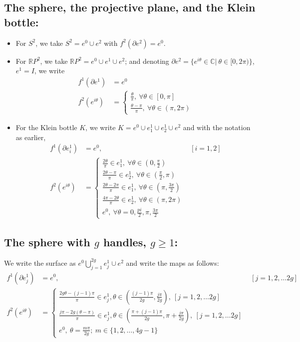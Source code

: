 \documentclass[11pt]{article}
\numberwithin{equation}{section}
\begin{document}
\subsection{\normalsize{The sphere, the projective plane, and the Klein bottle:}} 
\begin{itemize}
     \item For $S^2$, we take $S^2=e^0\cup e^2$ with $f^2(\partial e^2)=e^0$.
     \item For $\mathbb{R}P^2$, we take $\mathbb{R}P^2=e^0\cup e^1\cup e^2$; and denoting $\partial e^2=\{e^{i\theta}\in\mathbb{C}|\ \theta\in[0,2\pi)\}$, $e^1=I$, we write
     \begin{align*}
         f^1(\partial e^1) &= e^0 \\ 
         f^2(e^{i\theta})&= \begin{cases}\frac{\theta}{\pi},\ \forall\theta\in[0,\pi]\\ \frac{\theta-\pi}{\pi},\ \forall\theta\in(\pi,2\pi) \end{cases}
     \end{align*}
     \item For the Klein bottle $K$, we write $K=e^0\cup e^1_1\cup e^1_2\cup e^2$ and with the notation as earlier, 
     \begin{align*}
         f^1(\partial e^1_i) &= e^0, & [i=1,2]\\ 
         f^2(e^{i\theta})&= \begin{cases}\frac{2\theta}{\pi}\in e^1_1,\ \forall\theta\in\left(0,\frac{\pi}{2}\right) \\ \frac{2\theta-\pi}{\pi}\in e^1_2,\ \forall\theta\in\left(\frac{\pi}{2},\pi\right)\\ \frac{2\theta-2\pi}{\pi}\in e^1_1,\ \forall\theta\in\left(\pi,\frac{3\pi}{2}\right)\\ \frac{4\pi-2\theta}{\pi}\in e^1_2,\ \forall\theta\in\left(\pi,2\pi\right) \\ e^0,\ \forall \theta =0,\frac{pi}{2},\pi,\frac{3\pi}{2} \end{cases}
     \end{align*}
\end{itemize} 
\subsection{\normalsize{The sphere with $g$ handles, $g\geqslant 1$:}}
We write the surface as $e^0\bigcup_{j=1}^{2g}{e^1_j}\cup e^2$ and write the maps as follows: \begin{align*}
         f^1(\partial e^1_j) &= e^0, & [j=1,2,\dots 2g]\\ 
         f^2(e^{i\theta})&= \begin{cases} \frac{2g\theta-(j-1)\pi}{\pi}\in e^1_j, \theta\in\left(\frac{(j-1)\pi}{2g},\frac{j\pi}{2g}\right),\ [j=1,2,\dots 2g] \\ \frac{j\pi-2g(\theta-\pi)}{\pi}\in e^1_j, \theta\in\left(\frac{\pi+(j-1)\pi}{2g},\pi+\frac{j\pi}{2g}\right),\ [j=1,2,\dots 2g] \\ e^0,\ \theta=\frac{m\pi}{2g};\ m\in\{1,2,\dots,4g-1\} \end{cases}
     \end{align*}
\end{document}
